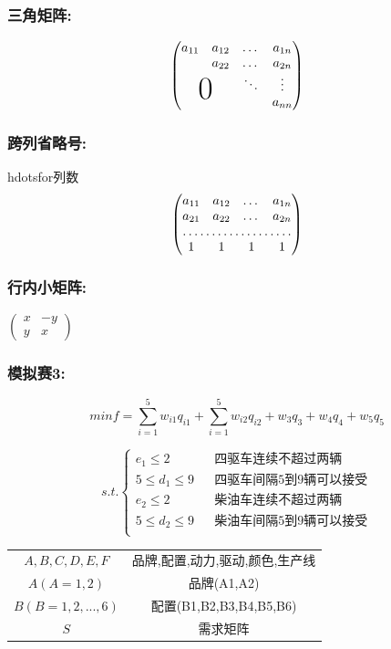 \documentclass[12pt]{ctexart}
\begin{document}
\subsubsection{三角矩阵:}
\[
\begin{pmatrix}
	a_{11} & a_{12} & \dots & a_{1n} \\
	& a_{22} & \dots & a_{2n} \\
	& & \ddots & \vdots \\
	\multicolumn{2}{c}{\raisebox{1.3ex}[0pt]{\Huge 0}}& & a_{nn}
\end{pmatrix}
\]

\subsubsection{跨列省略号:}
hdotsfor{列数}
\[
\begin{pmatrix}
	a_{11} & a_{12} & \dots & a_{1n} \\
	a_{21} & a_{22} & \dots & a_{2n} \\
	\hdotsfor{4} \\
	1 & 1 & 1 & 1
\end{pmatrix}
\]

\subsubsection{行内小矩阵:}
\begin{math}
	\left(	%
	\begin{smallmatrix}
		x & -y \\
		y & x
	\end{smallmatrix}
	\right)	%
\end{math}

\subsubsection{模拟赛3:}

$$min f=\sum_{i=1}^{5}w_{i1}q_{i1}+\sum_{i=1}^{5}w_{i2}q_{i2}+w_3q_3+w_4q_4+w_5q_5$$

$$s.t.\left\{
\begin{array}{rcl}
	       e_1\leq 2 &    &\text{四驱车连续不超过两辆}\\
	5 \leq d_1\leq 9 &    &\text{四驱车间隔5到9辆可以接受}\\
	       e_2\leq 2 &    &\text{柴油车连续不超过两辆}\\
	5 \leq d_2\leq 9 &    &\text{柴油车间隔5到9辆可以接受}\\
\end{array} 
\right.$$

\begin{center}
	\begin{tabular}{cc}
		\toprule[1.5pt]
		\makebox[0.3\textwidth][c]{符号}	&  \makebox[0.4\textwidth][c]{意义} \\
		\midrule[1pt]	
		$ A,B,C,D,E,F    $ &品牌,配置,动力,驱动,颜色,生产线\\
		$ A(A=1,2)       $ &品牌(A1,A2)\\
		$ B(B=1,2,...,6)  $ &配置(B1,B2,B3,B4,B5,B6)\\
		$ S $	&需求矩阵\\ 
		\bottomrule[1.5pt]
	\end{tabular}
\end{center}
\end{document}
